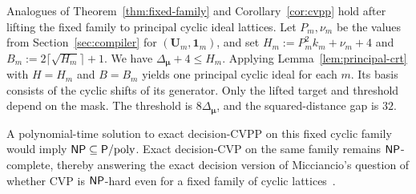 \begin{remark}
Analogues of Theorem~\ref{thm:fixed-family} and
Corollary~\ref{cor:cvpp} hold after lifting the fixed family to principal
cyclic ideal lattices.  Let \(P_m,\nu_m\) be the values from
Section~\ref{sec:compiler} for \((\mathbf U_m,\mathbf 1_m)\), and set
\(H_m:=P_m^2k_m+\nu_m+4\) and
\(B_m:=2\lceil\sqrt{H_m}\rceil+1\).
We have \(\Delta_{\boldsymbol\mu}+4\leq H_m\).  Applying
Lemma~\ref{lem:principal-crt} with \(H=H_m\) and \(B=B_m\) yields one
principal cyclic ideal for each \(m\).  Its basis consists of the cyclic
shifts of its generator.  Only the lifted target and threshold depend on the
mask.  The
threshold is \(8\Delta_{\boldsymbol\mu}\), and the squared-distance gap is
\(32\).

A polynomial-time solution to exact decision-CVPP on this fixed cyclic family
would imply \(\mathsf{NP}\subseteq\mathsf{P}/\mathrm{poly}\).  Exact decision-CVP on the same family
remains \(\mathsf{NP}\)-complete, thereby answering the exact decision version of
Micciancio's question of whether CVP is \(\mathsf{NP}\)-hard even for a fixed family
of cyclic lattices~\cite{Micciancio2007}.
\end{remark}
